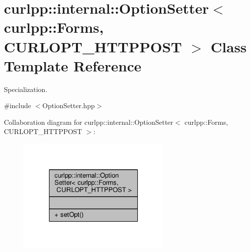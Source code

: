 \hypertarget{classcurlpp_1_1internal_1_1OptionSetter_3_01curlpp_1_1Forms_00_01CURLOPT__HTTPPOST_01_4}{\section{curlpp\-:\-:internal\-:\-:Option\-Setter$<$ curlpp\-:\-:Forms, C\-U\-R\-L\-O\-P\-T\-\_\-\-H\-T\-T\-P\-P\-O\-S\-T $>$ Class Template Reference}
\label{classcurlpp_1_1internal_1_1OptionSetter_3_01curlpp_1_1Forms_00_01CURLOPT__HTTPPOST_01_4}
}


Specialization.  




{\ttfamily \#include $<$Option\-Setter.\-hpp$>$}



Collaboration diagram for curlpp\-:\-:internal\-:\-:Option\-Setter$<$ curlpp\-:\-:Forms, C\-U\-R\-L\-O\-P\-T\-\_\-\-H\-T\-T\-P\-P\-O\-S\-T $>$\-:\nopagebreak
\begin{figure}[H]
\begin{center}
\leavevmode
\includegraphics[width=214pt]{classcurlpp_1_1internal_1_1OptionSetter_3_01curlpp_1_1Forms_00_01CURLOPT__HTTPPOST_01_4__coll__graph}
\end{center}
\end{figure}

